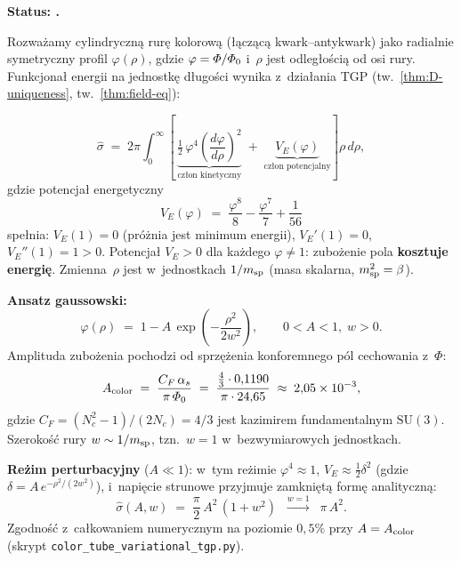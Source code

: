 \begin{proposition}%
\label{prop:X-tube-string-tension}
\textbf{Status: .}

Rozwa\.zamy cylindryczn\k{a} rur\k{e} kolorow\k{a} (\l{}\k{a}cz\k{a}c\k{a}
kwark--antykwark) jako radialnie symetryczny profil $\varphi(\rho)$,
gdzie $\varphi = \varPhi/\varPhi_0$ i~$\rho$ jest odleg\l{}o\'sci\k{a}
od osi rury. Funkcjona\l{} energii na jednostk\k{e} d\l{}ugo\'sci
wynika z~dzia\l{}ania TGP (tw.~\ref{thm:D-uniqueness},
tw.~\ref{thm:field-eq}):

\begin{equation}\label{eq:X-sigma-functional}
  \hat\sigma
  \;=\;
  2\pi\!\int_0^\infty\!\!
    \left[\,
      \underbrace{\tfrac{1}{2}\,\varphi^4\!\left(\frac{d\varphi}{d\rho}\right)^{\!2}}_{\text{cz\l{}on kinetyczny}}
      \;+\;
      \underbrace{V_E(\varphi)}_{\text{cz\l{}on potencjalny}}
    \right]
    \rho\,d\rho,
\end{equation}
gdzie potencja\l{} energetyczny
\begin{equation}\label{eq:X-VE-tube}
  V_E(\varphi)
  \;=\;
  \frac{\varphi^8}{8} - \frac{\varphi^7}{7} + \frac{1}{56}
\end{equation}
spe\l{}nia:
$V_E(1) = 0$
(pr\'o\.znia jest minimum energii),
$V_E'(1) = 0$,
$V_E''(1) = 1 > 0$.
Potencja\l{} $V_E > 0$ dla ka\.zdego $\varphi \ne 1$:
zubo\.zenie pola \textbf{kosztuje energi\k{e}}.
Zmienna~$\rho$ jest w~jednostkach $1/m_{\rm sp}$
(masa skalarna, $m_{\rm sp}^2 = \beta$).

\medskip\noindent
\textbf{Ansatz gaussowski:}
\begin{equation}\label{eq:X-gaussian-ansatz}
  \varphi(\rho)
  \;=\;
  1 - A\,\exp\!\left(-\frac{\rho^2}{2w^2}\right),
  \qquad
  0 < A < 1,\; w > 0.
\end{equation}
Amplituda zubo\.zenia pochodzi od sprz\k{e}\.zenia konforemnego
p\'ol cechowania z~$\Phi$:
\begin{equation}\label{eq:X-A-color}
  A_{\rm color}
  \;=\;
  \frac{C_F\,\alpha_s}{\pi\,\varPhi_0}
  \;=\;
  \frac{\tfrac{4}{3}\cdot 0{,}1190}{\pi\cdot 24{,}65}
  \;\approx\; 2{,}05 \times 10^{-3},
\end{equation}
gdzie $C_F = (N_c^2-1)/(2N_c) = 4/3$ jest kazimirem
fundamentalnym $\mathrm{SU}(3)$.
Szeroko\'s\'c rury $w \sim 1/m_{\rm sp}$,
tzn.~$w = 1$ w~bezwymiarowych jednostkach.

\medskip\noindent
\textbf{Re\.zim perturbacyjny} ($A \ll 1$):
w~tym re\.zimie $\varphi^4 \approx 1$, $V_E \approx \tfrac{1}{2}\delta^2$
(gdzie $\delta = A\,e^{-\rho^2/(2w^2)}$), i~napi\k{e}cie strunowe
przyjmuje zamkni\k{e}t\k{a} form\k{e} analityczn\k{a}:
\begin{equation}\label{eq:X-sigma-perturbative}
  \boxed{
    \hat\sigma(A,w)
    \;=\;
    \frac{\pi}{2}\,A^2\,(1 + w^2)
    \;\;\xrightarrow{w=1}\;\;
    \pi\,A^2.
  }
\end{equation}
Zgodno\'s\'c z~ca\l{}kowaniem numerycznym na poziomie $0{,}5\%$
przy $A = A_{\rm color}$ (skrypt
\texttt{color\_tube\_variational\_tgp.py}).


\end{proposition}
